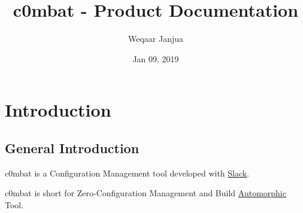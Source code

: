 \documentclass[letterpaper,10pt,english]{sphinxmanual}
\title{c0mbat - Product Documentation}
\date{Jan 09, 2019}
\author{Weqaar Janjua}
\begin{document}
\maketitle
\tableofcontents
{}\label{index::doc}



\chapter{Introduction}
\label{Introduction:introduction}\label{Introduction::doc}\label{Introduction:c0mbat-product-documentation}\label{Introduction:id1}

\section{General Introduction}
\label{Introduction:general-introduction}
c0mbat is a Configuration Management tool developed with \href{http://www.slack.com}{Slack}.

c0mbat is short for Zero-Configuration Management and Build \href{https://en.wikipedia.org/wiki/Automorphic\_number}{Automorphic} Tool.
\end{document}
